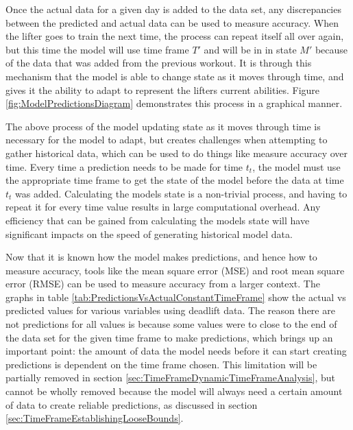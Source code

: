 Once the actual data for a given day is added to the data set, any discrepancies between the predicted and actual data can be used to measure accuracy. When the lifter goes to train the next time, the process can repeat itself all over again, but this time the model will use time frame $T'$ and will be in in state $M'$ because of the data that was added from the previous workout. It is through this mechanism that the model is able to change state as it moves through time, and gives it the ability to adapt to represent the lifters current abilities. Figure \ref{fig:ModelPredictionsDiagram} demonstrates this process in a graphical manner.

The above process of the model updating state as it moves through time is necessary for the model to adapt, but creates challenges when attempting to gather historical data, which can be used to do things like measure accuracy over time. Every time a prediction needs to be made for time $t_t$, the model must use the appropriate time frame to get the state of the model before the data at time $t_t$ was added. Calculating the models state is a non-trivial process, and having to repeat it for every time value results in large computational overhead. Any efficiency that can be gained from calculating the models state will have significant impacts on the speed of generating historical model data.

Now that it is known how the model makes predictions, and hence how to measure accuracy, tools like the mean square error (MSE) and root mean square error (RMSE) can be used to measure accuracy from a larger context. The graphs in table \ref{tab:PredictionsVsActualConstantTimeFrame} show the actual vs predicted values for various variables using deadlift data. The reason there are not predictions for all values is because some values were to close to the end of the data set for the given time frame to make predictions, which brings up an important point: the amount of data the model needs before it can start creating predictions is dependent on the time frame chosen. This limitation will be partially removed in section \ref{sec:TimeFrameDynamicTimeFrameAnalysis}, but cannot be wholly removed because the model will always need a certain amount of data to create reliable predictions, as discussed in section \ref{sec:TimeFrameEstablishingLooseBounds}.

